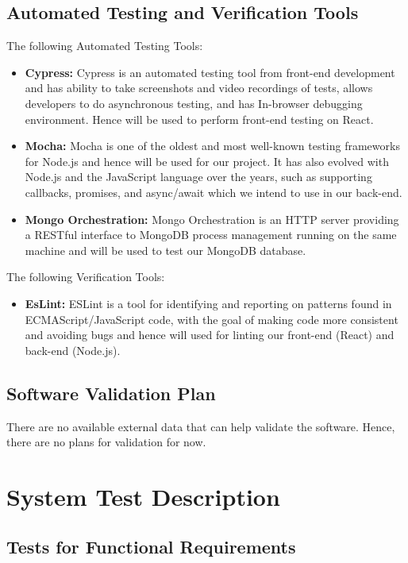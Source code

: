 \documentclass[12pt, titlepage]{article}
\begin{document}
\subsection{Automated Testing and Verification Tools}
The following Automated Testing Tools:
\begin{itemize}
    \item \textbf{Cypress:} Cypress is an automated testing tool from front-end development and has ability to take screenshots and video recordings of tests, allows developers to do asynchronous testing, and has In-browser debugging environment. Hence will be used to perform front-end testing on React.
    \item \textbf{Mocha:} Mocha is one of the oldest and most well-known testing frameworks for Node.js and hence will be used for our project. It has also evolved with Node.js and the JavaScript language over the years, such as supporting callbacks, promises, and async/await which we intend to use in our back-end.
    \item \textbf{Mongo Orchestration:} Mongo Orchestration is an HTTP server providing a RESTful interface to MongoDB process management running on the same machine and will be used to test our MongoDB database.
\end{itemize}
The following Verification Tools:
\begin{itemize}
    \item \textbf{EsLint:} ESLint is a tool for identifying and reporting on patterns found in ECMAScript/JavaScript code, with the goal of making code more consistent and avoiding bugs and hence will used for linting our front-end (React) and back-end (Node.js).
\end{itemize}

\subsection{Software Validation Plan}

There are no available external data that can help validate the software. Hence, there are no plans for validation for now.

\section{System Test Description}
	
\subsection{Tests for Functional Requirements}
\end{document}

